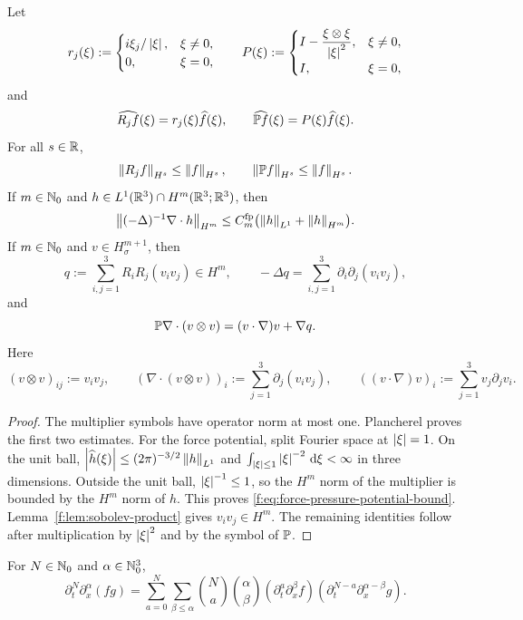 \begin{lemma}
\label{f:lem:riesz-leray}
Let
\[
 r_j(\xi):=
 \begin{cases}
 i\xi_j/\left|\xi\right|,&\xi\ne0,\\
 0,&\xi=0,
 \end{cases}
 \qquad
 P(\xi):=
 \begin{cases}
 I-\dfrac{\xi\otimes\xi}{\left|\xi\right|^2},&\xi\ne0,\\
 I,&\xi=0,
 \end{cases}
\]
and
\[
 \widehat{R_jf}(\xi)=r_j(\xi)\widehat f(\xi),
 \qquad
 \widehat{\mathbb P f}(\xi)=P(\xi)\widehat f(\xi).
\]
For all \(s\in\mathbb R\),
\[
 \left\lVert R_jf\right\rVert_{H^s}\le\left\lVert f\right\rVert_{H^s},
 \qquad
 \left\lVert \mathbb P f\right\rVert_{H^s}\le\left\lVert f\right\rVert_{H^s}.
\]
If \(m\in\mathbb N_0\) and \(h\in L^1(\mathbb R^3)\cap H^m(\mathbb R^3;\mathbb R^3)\), then
\begin{equation}
 \left\lVert (-\Delta)^{-1}\nabla\cdot h\right\rVert_{H^m}
 \le C_m^{\rm fp}\bigl(\left\lVert h\right\rVert_{L^1}+\left\lVert h\right\rVert_{H^m}\bigr).
 \label{f:eq:force-pressure-potential-bound}
\end{equation}
If \(m\in\mathbb N_0\) and \(v\in H^{m+1}_\sigma\), then
\[
 q:=\sum_{i,j=1}^3R_iR_j(v_iv_j)\in H^m,
 \qquad
 -\Delta q=\sum_{i,j=1}^3\partial_i\partial_j(v_iv_j),
\]
and
\[
 \mathbb P\nabla\cdot(v\otimes v)
 =(v\cdot\nabla)v+\nabla q.
\]
Here
\[
 (v\otimes v)_{ij}:=v_iv_j,
 \qquad
 (\nabla\cdot(v\otimes v))_i
 :=\sum_{j=1}^3\partial_j(v_iv_j),
 \qquad
 ((v\cdot\nabla)v)_i:=\sum_{j=1}^3v_j\partial_jv_i.
\]
\end{lemma}

\begin{proof}
The multiplier symbols have operator norm at most one.  Plancherel proves the
first two estimates.  For the force potential, split Fourier space at
\(\left|\xi\right|=1\).  On the unit ball,
\(\left|\widehat h(\xi)\right|\le(2\pi)^{-3/2}\left\lVert h\right\rVert_{L^1}\) and
\(\int_{\left|\xi\right|\le1}\left|\xi\right|^{-2}\,\mathrm d\xi<\infty\) in three dimensions.
Outside the unit ball, \(\left|\xi\right|^{-1}\le1\), so the \(H^m\) norm of the
multiplier is bounded by the \(H^m\) norm of \(h\).  This proves
\eqref{f:eq:force-pressure-potential-bound}.  Lemma~\ref{f:lem:sobolev-product} gives
\(v_iv_j\in H^m\).  The remaining identities follow after multiplication by
\(\left|\xi\right|^2\) and by the symbol of \(\mathbb P\).
\end{proof}

\begin{lemma}
\label{f:lem:mixed-leibniz}
For \(N\in\mathbb N_0\) and \(\alpha\in\mathbb N_0^3\),
\[
 \partial_t^N\partial_x^\alpha(fg)
 =\sum_{a=0}^N\sum_{\beta\le\alpha}
 \binom Na\binom\alpha\beta
 (\partial_t^a\partial_x^\beta f)
 (\partial_t^{N-a}\partial_x^{\alpha-\beta}g).
\]
\end{lemma}

